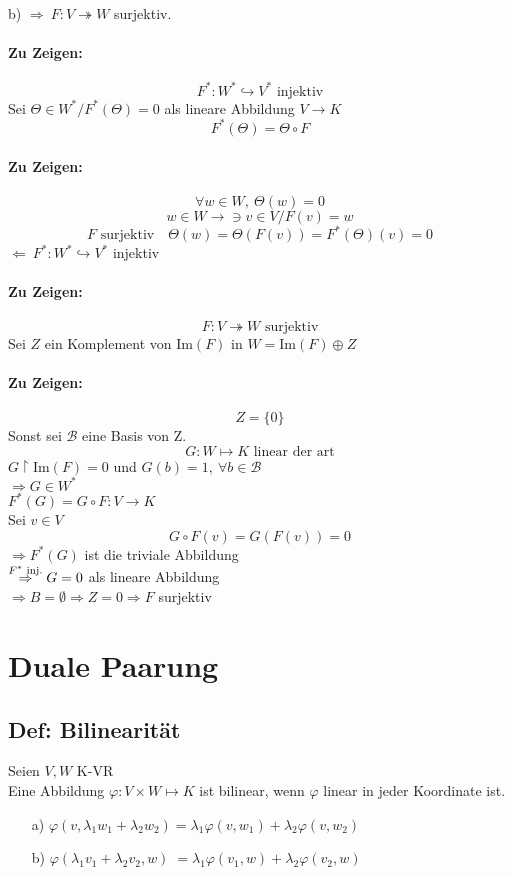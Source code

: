 \documentclass[titlepage,12pt,a4paper,ngerman]{report}
\newcommand{\tx}[1]{\textrm{#1}}
\begin{document}
b) $\boxed{\Rightarrow}\ F: V \twoheadrightarrow W$ surjektiv.
\paragraph{Zu Zeigen:} $$F^* : W^* \hookrightarrow V^* \tx{ injektiv}$$
Sei $\Theta \in W^* / F^* (\Theta) = 0$ als lineare Abbildung $V \to K$
$$F^* (\Theta) = \Theta \circ F$$
\paragraph{Zu Zeigen:} $$\forall w \in W,\ \Theta(w) = 0$$
$$w \in W \to \ni v \in V / F(v) = w$$
$$F \tx{ surjektiv} \quad \Theta(w) = \Theta(F(v)) = F^*(\Theta)(v) = 0 $$
$\boxed{\Leftarrow}\ F^* : W^* \hookrightarrow V^*$ injektiv
\paragraph{Zu Zeigen:} $$ F: V \twoheadrightarrow W \tx{ surjektiv}$$
Sei $Z$ ein Komplement von Im$(F)$ in $W=$Im$(F) \oplus Z$
\paragraph{Zu Zeigen:} $$Z = \{0\} $$
Sonst sei $\mathcal B$ eine Basis von Z. 
$$G: W \mapsto K \tx{ linear der art}$$
$G \upharpoonright$Im$(F) = 0$ und $G(b) = 1,\ \forall b \in \mathcal B$\\
$ \Rightarrow G \in W^* $\\
$ F^*(G) = G \circ F : V \to K $\\
Sei $ v \in V $
$$ G \circ F(v) = G(F(v)) = 0 $$
$\Rightarrow F^*(G) $ ist die triviale Abbildung\\
$ \buildrel F^* \tx{ inj.} \over \Rightarrow G =0 $ als lineare Abbildung\\
$ \Rightarrow B = \emptyset \Rightarrow Z = 0 \Rightarrow F $ surjektiv

\section{Duale Paarung}
\subsection{Def: Bilinearität}
Seien $ V,W $ K-VR\\
Eine Abbildung $ \varphi: V \times W \mapsto K $ ist bilinear, wenn $ \varphi $ linear in jeder Koordinate ist.
\begin{itemize}
	\item[a)] $ \varphi(v, \lambda_1w_1 + \lambda_2 w_2) = \lambda_1 \varphi(v, w_1) + \lambda_2 \varphi(v,w_2) $
	\item[b)] $ \varphi(\lambda_1 v_1 + \lambda_2 v_2, w) \;= \lambda_1 \varphi(v_1,w) + \lambda_2 \varphi(v_2,w) $
\end{itemize}
\end{document}
